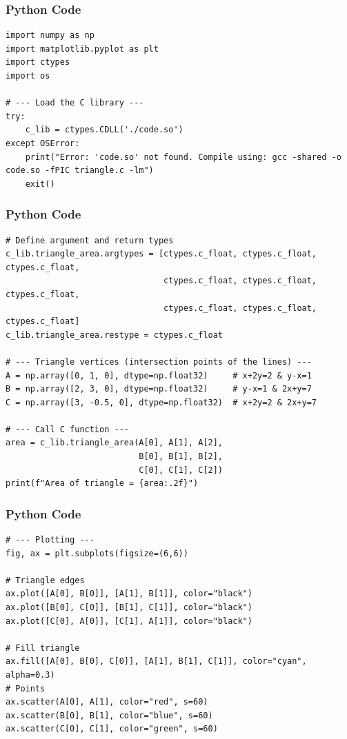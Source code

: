 \documentclass{beamer}
\begin{document}
\begin{frame}[fragile]
    \frametitle{Python Code}
    \begin{lstlisting}
import numpy as np
import matplotlib.pyplot as plt
import ctypes
import os

# --- Load the C library ---
try:
    c_lib = ctypes.CDLL('./code.so')
except OSError:
    print("Error: 'code.so' not found. Compile using: gcc -shared -o code.so -fPIC triangle.c -lm")
    exit()
    \end{lstlisting}
\end{frame}

\begin{frame}[fragile]
    \frametitle{Python Code}
    \begin{lstlisting}
# Define argument and return types
c_lib.triangle_area.argtypes = [ctypes.c_float, ctypes.c_float, ctypes.c_float,
                                ctypes.c_float, ctypes.c_float, ctypes.c_float,
                                ctypes.c_float, ctypes.c_float, ctypes.c_float]
c_lib.triangle_area.restype = ctypes.c_float

# --- Triangle vertices (intersection points of the lines) ---
A = np.array([0, 1, 0], dtype=np.float32)     # x+2y=2 & y-x=1
B = np.array([2, 3, 0], dtype=np.float32)     # y-x=1 & 2x+y=7
C = np.array([3, -0.5, 0], dtype=np.float32)  # x+2y=2 & 2x+y=7

# --- Call C function ---
area = c_lib.triangle_area(A[0], A[1], A[2],
                           B[0], B[1], B[2],
                           C[0], C[1], C[2])
print(f"Area of triangle = {area:.2f}")

    \end{lstlisting}
\end{frame}

\begin{frame}[fragile]
    \frametitle{Python Code}
    \begin{lstlisting}
# --- Plotting ---
fig, ax = plt.subplots(figsize=(6,6))

# Triangle edges
ax.plot([A[0], B[0]], [A[1], B[1]], color="black")
ax.plot([B[0], C[0]], [B[1], C[1]], color="black")
ax.plot([C[0], A[0]], [C[1], A[1]], color="black")

# Fill triangle
ax.fill([A[0], B[0], C[0]], [A[1], B[1], C[1]], color="cyan", alpha=0.3)
# Points
ax.scatter(A[0], A[1], color="red", s=60)
ax.scatter(B[0], B[1], color="blue", s=60)
ax.scatter(C[0], C[1], color="green", s=60)

    \end{lstlisting}
\end{frame}
\end{document}
